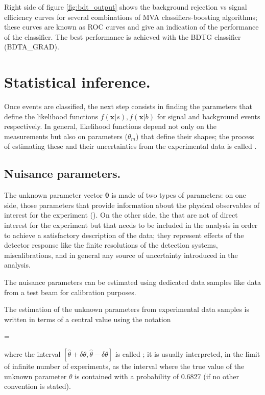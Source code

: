 Right side of figure \ref{fig:bdt_output} shows the background rejection vs signal efficiency curves for several combinations of MVA classifiers-boosting algorithms; these curves are known as ROC curves and give an indication of the performance of the classifier. The best performance is achieved with the BDTG classifier (BDTA\_GRAD).   

\section{Statistical inference.}

Once events are classified, the next step consists in finding the parameters that define the likelihood functions $f(\textbf{x}|s), f(\textbf{x}|b)$ for signal and background events respectively. In general, likelihood functions depend not only on the measurements but also on parameters ($\theta_m$) that define their shapes; the process of estimating these  and their uncertainties from the experimental data is called . 

\subsection{Nuisance parameters.}

The unknown parameter vector $\bm{\theta}$ is made of two types of parameters: on one side, those parameters that provide information about the physical observables of interest for the experiment (). On the other side, the  that are not of direct interest for the experiment but that needs to be included in the analysis in order to achieve a satisfactory description of the data; they represent effects of the detector response like the finite resolutions of the detection systems, miscalibrations, and in general any source of uncertainty introduced in the analysis.

The nuisance parameters can be estimated using dedicated data samples like data from a test beam for calibration purposes. 

The estimation of the unknown parameters from experimental data samples is written in terms of a central value using the notation

\beqn
\theta=\hat{\theta}\pm\delta \theta  
\eeqn

\noindent where the interval $[\hat{\theta}+\delta \theta, \hat{\theta}-\delta \theta]$ is called ; it is usually interpreted, in the limit of infinite number of experiments, as the interval where the true value of the unknown parameter $\theta$ is contained with a probability of 0.6827 (if no other convention is stated).  

